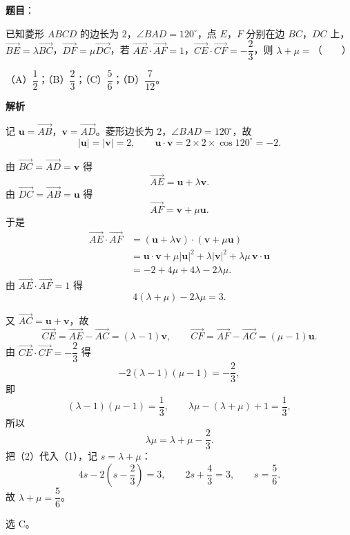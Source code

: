 \begin{answer}

\textbf{题目}：

已知菱形 $ABCD$ 的边长为 $2$，$\angle BAD=120^\circ$，点 $E$，$F$ 分别在边 $BC$，$DC$ 上，$\overrightarrow{BE}=\lambda\overrightarrow{BC}$，$\overrightarrow{DF}=\mu\overrightarrow{DC}$，若 $\overrightarrow{AE}\cdot\overrightarrow{AF}=1$，$\overrightarrow{CE}\cdot\overrightarrow{CF}=-\dfrac23$，则 $\lambda+\mu=$\mbox{（　　）}

（A）$\dfrac12$；（B）$\dfrac23$；（C）$\dfrac56$；（D）$\dfrac{7}{12}$。

\textbf{解析}

记 $\boldsymbol u=\overrightarrow{AB}$，$\boldsymbol v=\overrightarrow{AD}$。菱形边长为 $2$，$\angle BAD=120^\circ$，故
\nopagebreak[4]
\[|\boldsymbol u|=|\boldsymbol v|=2,\qquad \boldsymbol u\cdot\boldsymbol v=2\times2\times\cos120^\circ=-2.\]

由 $\overrightarrow{BC}=\overrightarrow{AD}=\boldsymbol v$ 得
\nopagebreak[4]
\[\overrightarrow{AE}=\boldsymbol u+\lambda\boldsymbol v.\]
由 $\overrightarrow{DC}=\overrightarrow{AB}=\boldsymbol u$ 得
\nopagebreak[4]
\[\overrightarrow{AF}=\boldsymbol v+\mu\boldsymbol u.\]
于是
\nopagebreak[4]
\[\begin{aligned}
\overrightarrow{AE}\cdot\overrightarrow{AF}
&=(\boldsymbol u+\lambda\boldsymbol v)\cdot(\boldsymbol v+\mu\boldsymbol u)\\
&=\boldsymbol u\cdot\boldsymbol v+\mu|\boldsymbol u|^2+\lambda|\boldsymbol v|^2+\lambda\mu\,\boldsymbol v\cdot\boldsymbol u\\
&=-2+4\mu+4\lambda-2\lambda\mu.
\end{aligned}\]
由 $\overrightarrow{AE}\cdot\overrightarrow{AF}=1$ 得
\nopagebreak[4]
\[4(\lambda+\mu)-2\lambda\mu=3. \tag{1}\]

又 $\overrightarrow{AC}=\boldsymbol u+\boldsymbol v$，故
\nopagebreak[4]
\[\overrightarrow{CE}=\overrightarrow{AE}-\overrightarrow{AC}=(\lambda-1)\boldsymbol v,\qquad
\overrightarrow{CF}=\overrightarrow{AF}-\overrightarrow{AC}=(\mu-1)\boldsymbol u.\]
由 $\overrightarrow{CE}\cdot\overrightarrow{CF}=-\dfrac23$ 得
\nopagebreak[4]
\[-2(\lambda-1)(\mu-1)=-\frac23,\]
即
\nopagebreak[4]
\[(\lambda-1)(\mu-1)=\frac13,\qquad \lambda\mu-(\lambda+\mu)+1=\frac13,\]
所以
\nopagebreak[4]
\[\lambda\mu=\lambda+\mu-\frac23. \tag{2}\]
把（2）代入（1），记 $s=\lambda+\mu$：
\nopagebreak[4]
\[4s-2\left(s-\frac23\right)=3,\qquad 2s+\frac43=3,\qquad s=\frac56.\]
故 $\lambda+\mu=\dfrac56$。

选 C。


\end{answer}

